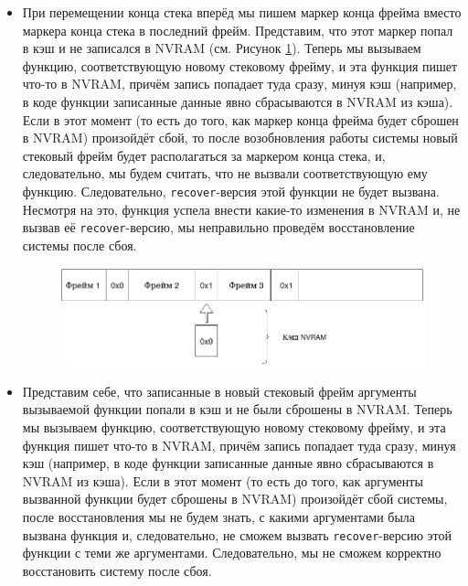 \documentclass[times,specification,annotation]{itmo-student-thesis}
\begin{document}
\begin{itemize}
    \item При перемещении конца стека вперёд мы пишем маркер конца фрейма вместо маркера конца стека в последний фрейм. Представим, что этот маркер попал в кэш и не записался в NVRAM (см. Рисунок \ref{marker-not-flushed-pic}). Теперь мы вызываем функцию, соответствующую новому стековому фрейму, и эта функция пишет что-то в NVRAM, причём запись попадает туда сразу, минуя кэш (например, в коде функции записанные данные явно сбрасываются в NVRAM из кэша). Если в этот момент (то есть до того, как маркер конца фрейма будет сброшен в NVRAM) произойдёт сбой, то после возобновления работы системы новый стековый фрейм будет располагаться за маркером конца стека, и, следовательно, мы будем считать, что не вызвали соответствующую ему функцию. Следовательно, \texttt{recover}-версия этой функции не будет вызвана. Несмотря на это, функция успела внести какие-то изменения в NVRAM и, не вызвав её \texttt{recover}-версию, мы неправильно проведём восстановление системы после сбоя.
    
    
    \begin{figure}[H]
      \begin{center}
      \includegraphics[width=\linewidth]{marker_not_flushed.png}
      \label{marker-not-flushed-pic}
      \end{center}
    \end{figure}
    
    \item Представим себе, что записанные в новый стековый фрейм аргументы вызываемой функции попали в кэш и не были сброшены в NVRAM. Теперь мы вызываем функцию, соответствующую новому стековому фрейму, и эта функция пишет что-то в NVRAM, причём запись попадает туда сразу, минуя кэш (например, в коде функции записанные данные явно сбрасываются в NVRAM из кэша). Если в этот момент (то есть до того, как аргументы вызванной функции будет сброшены в NVRAM) произойдёт сбой системы, после восстановления мы не будем знать, с какими аргументами была вызвана функция и, следовательно, не сможем вызвать \texttt{recover}-версию этой функции с теми же аргументами. Следовательно, мы не сможем корректно восстановить систему после сбоя.
\end{itemize}
\end{document}
